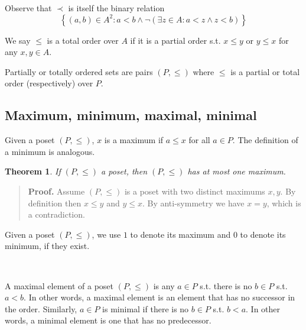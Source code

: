 \documentclass[a4paper, 12pt]{article}
\newtheorem{theorem}{Theorem}
\newtheorem{theorem}{Theorem}
\begin{document}
Observe that $\prec$ is itself the binary relation 
$$\left\{ (a, b) \in A^2 : a <
b \land \neg \left( \exists z \in A : a < z \land z < b \right) \right\} $$

\begin{definition}
    We say $\leq$ is a total order over $A$ if it is a partial order s.t. $x
    \leq y$ or $y \leq x$ for any $x, y \in A$.
\end{definition}

Partially or totally ordered sets are pairs $(P, \leq)$ where $\leq$ is a
partial or total order (respectively) over $P$.

\subsection{Maximum, minimum, maximal, minimal}

Given a poset $(P, \leq)$, $x$ is a maximum if $a \leq x$ for all $a \in P$. The
definition of a minimum is analogous.  

\begin{theorem}
    If $(P, \leq)$ a poset, then $(P, \leq) $ has at most one maximum.
\end{theorem}


\small
\begin{quote}

\textbf{Proof.} Assume $(P, \leq) $ is a poset with two distinct maximums $x, y$. By
definition then $x \leq y$ and $y \leq x$. By anti-symmetry we have $x = y$,
which is a contradiction.

\end{quote}
\normalsize

Given a poset $(P, \leq) $, we use $1$ to denote its maximum and $0$ to denote
its minimum, if they exist. 

~ 

A maximal element of a poset $(P, \leq) $ is any $a \in P$ s.t. there is no $b
\in P$ s.t. $a < b$. In other words, a maximal element is an element that has no
successor in the order. Similarly, $a \in P$ is minimal if there is no $b \in P$
s.t. $b < a$. In other words, a minimal element is one that has no predecessor.
\end{document}
